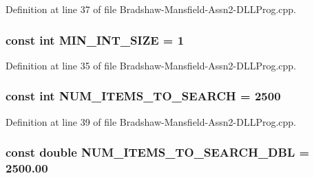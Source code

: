 Definition at line 37 of file Bradshaw-\/Mansfield-\/Assn2-\/DLLProg.cpp.

\hypertarget{_bradshaw-_mansfield-_assn2-_d_l_l_prog_8cpp_a2e30ee6cd6a71066a4c99da7204c73bd}{
\subsubsection[{MIN\_\-INT\_\-SIZE}]{\setlength{\rightskip}{0pt plus 5cm}const int {\bf MIN\_\-INT\_\-SIZE} = 1}}
\label{_bradshaw-_mansfield-_assn2-_d_l_l_prog_8cpp_a2e30ee6cd6a71066a4c99da7204c73bd}


Definition at line 35 of file Bradshaw-\/Mansfield-\/Assn2-\/DLLProg.cpp.

\hypertarget{_bradshaw-_mansfield-_assn2-_d_l_l_prog_8cpp_a02ce5f32cab205c8455bd8b976085c50}{
\subsubsection[{NUM\_\-ITEMS\_\-TO\_\-SEARCH}]{\setlength{\rightskip}{0pt plus 5cm}const int {\bf NUM\_\-ITEMS\_\-TO\_\-SEARCH} = 2500}}
\label{_bradshaw-_mansfield-_assn2-_d_l_l_prog_8cpp_a02ce5f32cab205c8455bd8b976085c50}


Definition at line 39 of file Bradshaw-\/Mansfield-\/Assn2-\/DLLProg.cpp.

\hypertarget{_bradshaw-_mansfield-_assn2-_d_l_l_prog_8cpp_ad619de5a53a38d732b9c5da01523a23e}{
\subsubsection[{NUM\_\-ITEMS\_\-TO\_\-SEARCH\_\-DBL}]{\setlength{\rightskip}{0pt plus 5cm}const double {\bf NUM\_\-ITEMS\_\-TO\_\-SEARCH\_\-DBL} = 2500.00}}
\label{_bradshaw-_mansfield-_assn2-_d_l_l_prog_8cpp_ad619de5a53a38d732b9c5da01523a23e}



